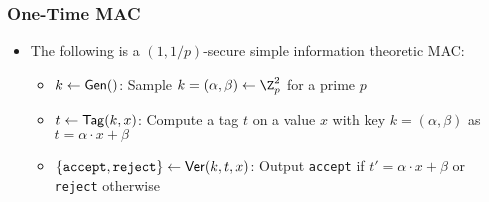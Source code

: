 \subsubsection{One-Time MAC}%
\begin{itemize}
    \item The following is a $(1, 1/p)$-secure simple information theoretic MAC:
    \begin{itemize}
        \item $k \leftarrow \mathsf{Gen}()$: Sample $k = (\alpha, \beta) \leftarrow \Z_p^2$ for a prime $p$
        \item $t \leftarrow \mathsf{Tag}(k,x)$: Compute a tag $t$ on a value $x$ with key $k = (\alpha, \beta)$ as $t = \alpha \cdot x + \beta$
        \item $\{\texttt{accept}, \texttt{reject}\} \leftarrow \mathsf{Ver}(k, t, x)$: Output \texttt{accept} if $t' = \alpha \cdot x + \beta$ or \texttt{reject} otherwise
    \end{itemize}

\end{itemize}

